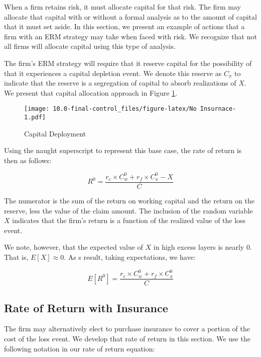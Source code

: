 \documentclass[
]{article}
\begin{document}
When a firm retains risk, it must allocate capital for that risk. The
firm may allocate that capital with or without a formal analysis as to
the amount of capital that it must set aside. In this section, we
present an example of actions that a firm with an ERM strategy may take
when faced with risk. We recognize that not all firms will allocate
capital using this type of analysis.

The firm's ERM strategy will require that it reserve capital for the
possibility of that it experiences a capital depletion event. We denote
this reserve as \(C_{x}\) to indicate that the reserve is a segregation
of capital to absorb realizations of \(X\). We present that capital
allocation approach in Figure \ref{fig:cap-deploy}.

\begin{figure}
\centering
\texttt{[image: 10.0-final-control\_files/figure-latex/No Insurnace-1.pdf]}
\caption{\label{fig:cap-deploy}Capital Deployment}
\end{figure}

Using the naught superscript to represent this base case, the rate of
return is then as follows:

\begin{equation}
R^0 = \dfrac{r_c \times C_{w}^{0} + r_f \times C_{x}^{0} - X}{C} \label{eqn:return-base}
\end{equation}

The numerator is the sum of the return on working capital and the return
on the reserve, less the value of the claim amount. The inclusion of the
random variable \(X\) indicates that the firm's return is a function of
the realized value of the loss event.

We note, however, that the expected value of \(X\) in high excess layers
is nearly 0. That is, \(E[X] \approx 0\). As s result, taking
expectations, we have:

\begin{equation}
E[R^0] = \dfrac{r_c \times C_{w}^{0} + r_f \times C_{x}^{0}}{C} \label{eqn:exp-return-base}
\end{equation}

\hypertarget{rate-of-return-with-insurance}{%
\subsection{Rate of Return with
Insurance}\label{rate-of-return-with-insurance}}

The firm may alternatively elect to purchase insurance to cover a
portion of the cost of the loss event. We develop that rate of return in
this section. We use the following notation in our rate of return
equation:
\end{document}
